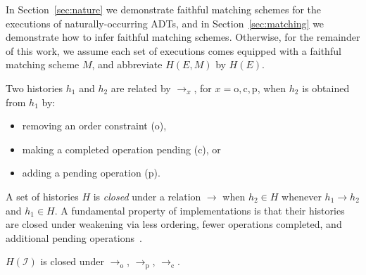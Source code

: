 In Section~\ref{sec:nature} we demonstrate faithful matching schemes for the
executions of naturally-occurring ADTs, and in Section~\ref{sec:matching} we
demonstrate how to infer faithful matching schemes. Otherwise, for the
remainder of this work, we assume each set of executions comes equipped with a
faithful matching scheme $M$, and abbreviate $H(E,M)$ by $H(E)$.

Two histories $h_1$ and $h_2$ are related by $\to_x$, for $x = \mathrm{o},
\mathrm{c}, \mathrm{p}$, when $h_2$ is obtained from $h_1$ by:
\begin{itemize}

  \item removing an order constraint (o),

  \item making a completed operation pending (c), or

  \item adding a pending operation (p).

\end{itemize}
A set of histories $H$ is \emph{closed} under a relation $\to$ when $h_2 \in H$
whenever $h_1 \to h_2$ and $h_1 \in H$. A fundamental property of
implementations is that their histories are closed under weakening via less
ordering, fewer operations completed, and additional pending
operations~\cite{conf/popl/BouajjaniEEH15}.

\begin{lemma}

  $H(\mathcal{I})$ is closed under $\to_\mathrm{o}$, $\to_\mathrm{p}$, 
  $\to_\mathrm{c}$.

\end{lemma}
